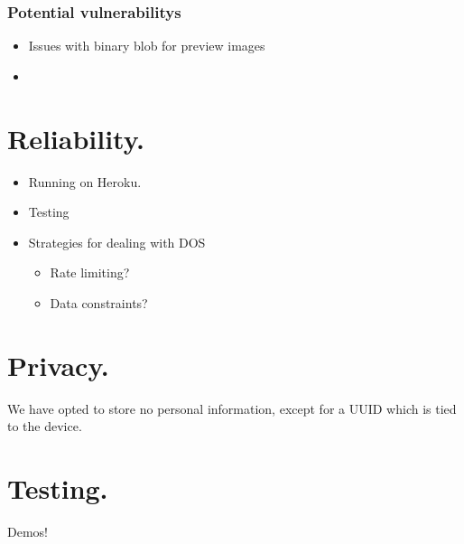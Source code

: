 \documentclass{beamer}
\begin{document}
\subsubsection*{Potential vulnerabilitys}
\begin{itemize}
  \item Issues with binary blob for preview images
  \item
\end{itemize}

\newpage
\section*{Reliability.}
  \begin{itemize}
    \item Running on Heroku.
    \item Testing
    \item Strategies for dealing with DOS
      \begin{itemize}
        \item Rate limiting?
        \item Data constraints?
      \end{itemize}
\end{itemize}

\newpage
\section*{Privacy.}
We have opted to store no personal information, except for a UUID which is tied to the device.


\newpage
\section*{Testing.}
 Demos!

\end{document}
